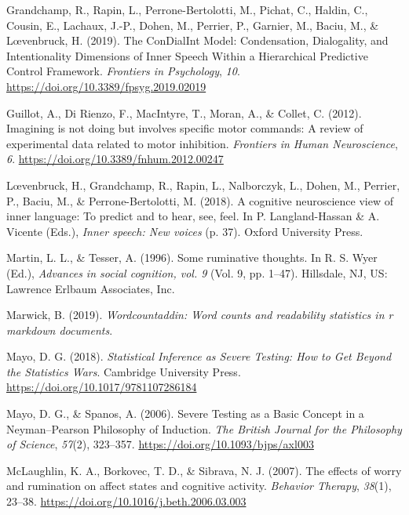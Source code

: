 \documentclass[
  man, donotrepeattitle,floatsintext]{apa6}
\newlength{\cslhangindent}
\newlength{\cslentryspacingunit} %
\newenvironment{CSLReferences}[2] %
 {%
  \setlength{\parindent}{0pt}
  \ifodd #1
  \let\oldpar\par
  \def\par{\hangindent=\cslhangindent\oldpar}
  \fi
  \setlength{\parskip}{#2\cslentryspacingunit}
 }%
 {}
\begin{document}
\begin{CSLReferences}{1}{0}
\leavevmode{}%
Grandchamp, R., Rapin, L., Perrone-Bertolotti, M., Pichat, C., Haldin, C., Cousin, E., Lachaux, J.-P., Dohen, M., Perrier, P., Garnier, M., Baciu, M., \& Lœvenbruck, H. (2019). The {ConDialInt} {Model}: {Condensation}, {Dialogality}, and {Intentionality} {Dimensions} of {Inner} {Speech} {Within} a {Hierarchical} {Predictive} {Control} {Framework}. \emph{Frontiers in Psychology}, \emph{10}. \url{https://doi.org/10.3389/fpsyg.2019.02019}

\leavevmode{}%
Guillot, A., Di Rienzo, F., MacIntyre, T., Moran, A., \& Collet, C. (2012). Imagining is not doing but involves specific motor commands: {A} review of experimental data related to motor inhibition. \emph{Frontiers in Human Neuroscience}, \emph{6}. \url{https://doi.org/10.3389/fnhum.2012.00247}

\leavevmode{}%
Lœvenbruck, H., Grandchamp, R., Rapin, L., Nalborczyk, L., Dohen, M., Perrier, P., Baciu, M., \& Perrone-Bertolotti, M. (2018). A cognitive neuroscience view of inner language: To predict and to hear, see, feel. In P. Langland-Hassan \& A. Vicente (Eds.), \emph{Inner speech: {New} voices} (p. 37). Oxford University Press.

\leavevmode{}%
Martin, L. L., \& Tesser, A. (1996). Some ruminative thoughts. In R. S. Wyer (Ed.), \emph{Advances in social cognition, vol. 9} (Vol. 9, pp. 1--47). Hillsdale, NJ, US: Lawrence Erlbaum Associates, Inc.

\leavevmode{}%
Marwick, B. (2019). \emph{Wordcountaddin: Word counts and readability statistics in r markdown documents}.

\leavevmode{}%
Mayo, D. G. (2018). \emph{Statistical {Inference} as {Severe} {Testing}: {How} to {Get} {Beyond} the {Statistics} {Wars}}. Cambridge University Press. \url{https://doi.org/10.1017/9781107286184}

\leavevmode{}%
Mayo, D. G., \& Spanos, A. (2006). Severe {Testing} as a {Basic} {Concept} in a {Neyman}--{Pearson} {Philosophy} of {Induction}. \emph{The British Journal for the Philosophy of Science}, \emph{57}(2), 323--357. \url{https://doi.org/10.1093/bjps/axl003}

\leavevmode{}%
McLaughlin, K. A., Borkovec, T. D., \& Sibrava, N. J. (2007). The effects of worry and rumination on affect states and cognitive activity. \emph{Behavior Therapy}, \emph{38}(1), 23--38. \url{https://doi.org/10.1016/j.beth.2006.03.003}


\end{CSLReferences}
\end{document}
